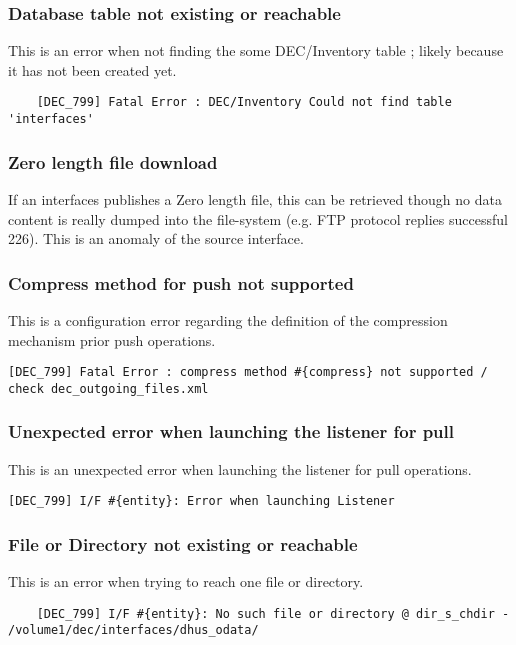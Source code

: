 \documentclass[dec_sum_main.tex]{subfiles}
\begin{document}
\subsubsection{Database table not existing or reachable}
This is an error when not finding the some DEC/Inventory table ; likely because it has not been created yet.
\begin{verbatim}
	[DEC_799] Fatal Error : DEC/Inventory Could not find table 'interfaces'
\end{verbatim}

\subsubsection{Zero length file download}
If an interfaces publishes a Zero length file, this can be retrieved though no data content is really dumped into the file-system (e.g. FTP protocol replies successful 226). This is an anomaly of the source interface.

\subsubsection{Compress method for push not supported}
This is a configuration error regarding the definition of the compression mechanism prior push operations.
\begin{verbatim}
[DEC_799] Fatal Error : compress method #{compress} not supported / check dec_outgoing_files.xml
\end{verbatim}

\subsubsection{Unexpected error when launching the listener for pull}
This is an unexpected error when launching the listener for pull operations.
\begin{verbatim}
[DEC_799] I/F #{entity}: Error when launching Listener
\end{verbatim}

\subsubsection{File or Directory  not existing or reachable}
This is an error when trying to reach one file or directory.
\begin{verbatim}
	[DEC_799] I/F #{entity}: No such file or directory @ dir_s_chdir - /volume1/dec/interfaces/dhus_odata/
\end{verbatim}
\end{document}
